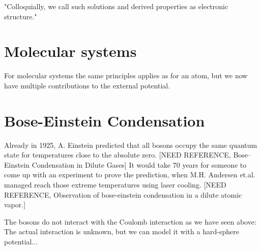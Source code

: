 "Colloquially, we call such solutions and derived properties as electronic structure."

\section{Molecular systems}
For molecular systems the same principles applies as for an atom, but we now have multiple contributions to the external potential. 

\section{Bose-Einstein Condensation}
Already in 1925, A. Einstein predicted that all bosons occupy the same quantum state for temperatures close to the absolute zero. [NEED REFERENCE, Bose–Einstein Condensation in Dilute Gases] It would take 70 years for someone to come up with an experiment to prove the prediction, when M.H. Andersen et.al. managed reach those extreme temperatures using laser cooling. [NEED REFERENCE, Observation of bose-einstein condensation in a dilute atomic vapor.]

The bosons do not interact with the Coulomb interaction as we have seen above: The actual interaction is unknown, but we can model it with a hard-sphere potential...

